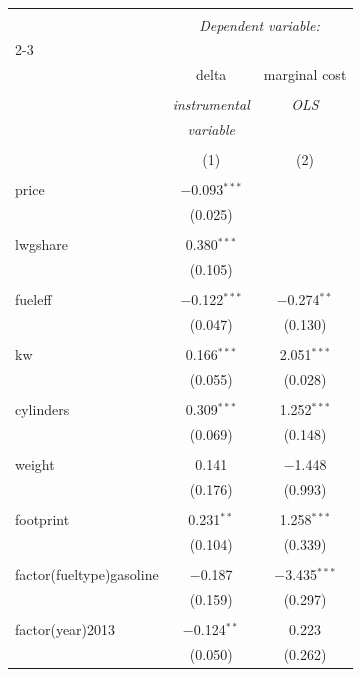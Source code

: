 
\begin{table}[!htbp] \centering 
  \caption{} 
  \label{} 
\begin{tabular}{@{\extracolsep{5pt}}lcc} 
\\[-1.8ex]\hline 
\hline \\[-1.8ex] 
 & \multicolumn{2}{c}{\textit{Dependent variable:}} \\ 
\cline{2-3} 
\\[-1.8ex] & delta & marginal cost \\ 
\\[-1.8ex] & \textit{instrumental} & \textit{OLS} \\ 
 & \textit{variable} & \textit{} \\ 
\\[-1.8ex] & (1) & (2)\\ 
\hline \\[-1.8ex] 
 price & $-$0.093$^{***}$ &  \\ 
  & (0.025) &  \\ 
  & & \\ 
 lwgshare & 0.380$^{***}$ &  \\ 
  & (0.105) &  \\ 
  & & \\ 
 fueleff & $-$0.122$^{***}$ & $-$0.274$^{**}$ \\ 
  & (0.047) & (0.130) \\ 
  & & \\ 
 kw & 0.166$^{***}$ & 2.051$^{***}$ \\ 
  & (0.055) & (0.028) \\ 
  & & \\ 
 cylinders & 0.309$^{***}$ & 1.252$^{***}$ \\ 
  & (0.069) & (0.148) \\ 
  & & \\ 
 weight & 0.141 & $-$1.448 \\ 
  & (0.176) & (0.993) \\ 
  & & \\ 
 footprint & 0.231$^{**}$ & 1.258$^{***}$ \\ 
  & (0.104) & (0.339) \\ 
  & & \\ 
 factor(fueltype)gasoline & $-$0.187 & $-$3.435$^{***}$ \\ 
  & (0.159) & (0.297) \\ 
  & & \\ 
 factor(year)2013 & $-$0.124$^{**}$ & 0.223 \\ 
  & (0.050) & (0.262) \\ 

\end{tabular}
\end{table}
